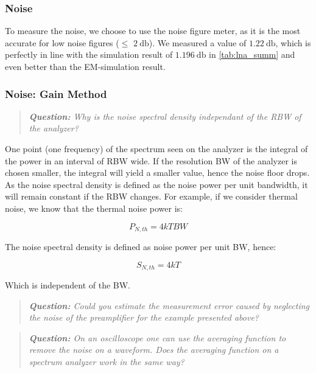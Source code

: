 \documentclass[a4paper]{article}        %
\begin{document}
  \subsubsection{Noise}
  To measure the noise, we choose to use the noise figure meter, as it is the most accurate for low noise figures ($\le$ $\SI{2}{\decibel}$).
  We measured a value of $\SI{1.22}{\decibel}$, which is perfectly in line with the simulation result of $\SI{1.196}{\decibel}$ in \autoref{tab:lna_summ} and even better than the EM-simulation result.

  \subsubsection{Noise: Gain Method}

  \begin{quote} \textit{\textbf{Question:} Why is the noise spectral density independant of the RBW of the analyzer? }\end{quote}

  One point (one frequency) of the spectrum seen on the analyzer is the integral of the power in an interval of RBW wide. If the resolution BW of the analyzer is chosen smaller, the integral will yield a smaller value, hence the noise floor drops. As the noise spectral density is defined as the noise power per unit bandwidth, it will remain constant if the RBW changes. For example, if we consider thermal noise, we know that the thermal noise power is: 

  \begin{equation}
  	P_{N,th} = 4 k T BW 
  \end{equation}

  The noise spectral density is defined as noise power per unit BW, hence: 

  \begin{equation}
  	S_{N,th} = 4 k T
  \end{equation}

  Which is independent of the BW. 

  \begin{quote} \textit{\textbf{Question:} Could you estimate the measurement error caused by neglecting the noise of the preamplifier for the example presented above? }\end{quote}



  \begin{quote} \textit{\textbf{Question:} On an oscilloscope one can use the averaging function to remove the noise on a waveform. Does the averaging function on a spectrum analyzer work in the same way? }\end{quote}
\end{document}
